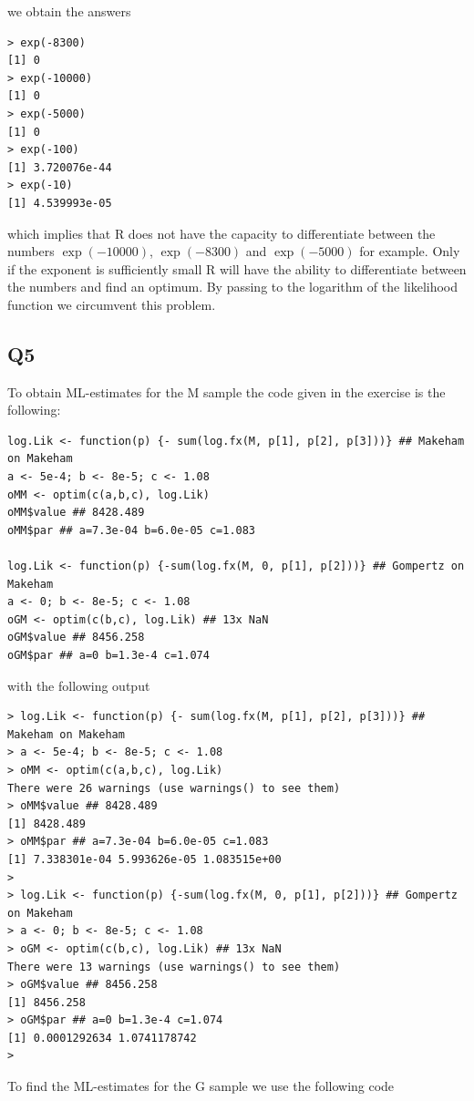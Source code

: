 \documentclass[11pt]{article}
\begin{document}
we obtain the answers

\begin{verbatim}
> exp(-8300)
[1] 0
> exp(-10000)
[1] 0
> exp(-5000)
[1] 0
> exp(-100)
[1] 3.720076e-44
> exp(-10)
[1] 4.539993e-05
\end{verbatim}

which implies that R does not have the capacity to differentiate between the numbers $\exp{(-10000)}$, $\exp{(-8300)}$ and $\exp{(-5000)}$ for example. Only if the exponent is sufficiently small R will have the ability to differentiate between the numbers and find an optimum. By passing to the logarithm of the likelihood function we circumvent this problem. 


\subsection*{Q5}

To obtain ML-estimates for the M sample the code given in the exercise is the following:
\begin{verbatim}
log.Lik <- function(p) {- sum(log.fx(M, p[1], p[2], p[3]))} ## Makeham on Makeham
a <- 5e-4; b <- 8e-5; c <- 1.08
oMM <- optim(c(a,b,c), log.Lik) 
oMM$value ## 8428.489
oMM$par ## a=7.3e-04 b=6.0e-05 c=1.083

log.Lik <- function(p) {-sum(log.fx(M, 0, p[1], p[2]))} ## Gompertz on Makeham
a <- 0; b <- 8e-5; c <- 1.08
oGM <- optim(c(b,c), log.Lik) ## 13x NaN
oGM$value ## 8456.258
oGM$par ## a=0 b=1.3e-4 c=1.074

\end{verbatim}

with the following output

\begin{verbatim}
> log.Lik <- function(p) {- sum(log.fx(M, p[1], p[2], p[3]))} ## Makeham on Makeham
> a <- 5e-4; b <- 8e-5; c <- 1.08
> oMM <- optim(c(a,b,c), log.Lik) 
There were 26 warnings (use warnings() to see them)
> oMM$value ## 8428.489
[1] 8428.489
> oMM$par ## a=7.3e-04 b=6.0e-05 c=1.083
[1] 7.338301e-04 5.993626e-05 1.083515e+00
> 
> log.Lik <- function(p) {-sum(log.fx(M, 0, p[1], p[2]))} ## Gompertz on Makeham
> a <- 0; b <- 8e-5; c <- 1.08
> oGM <- optim(c(b,c), log.Lik) ## 13x NaN
There were 13 warnings (use warnings() to see them)
> oGM$value ## 8456.258
[1] 8456.258
> oGM$par ## a=0 b=1.3e-4 c=1.074
[1] 0.0001292634 1.0741178742
> 
\end{verbatim}

To find the ML-estimates for the G sample we use the following code
\end{document}
